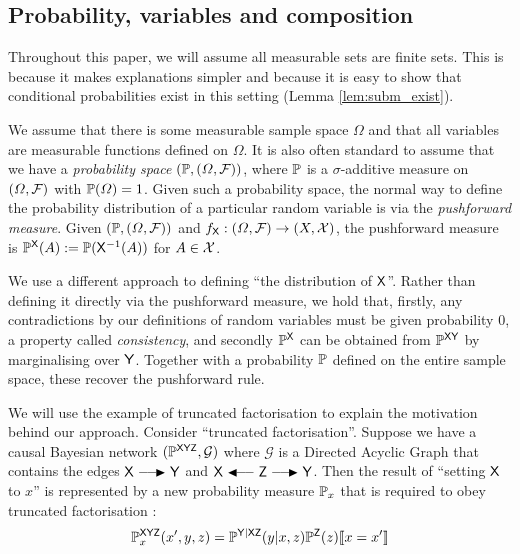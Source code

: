 
\subsection{Probability, variables and composition}

Throughout this paper, we will assume all measurable sets are finite sets. This is because it makes explanations simpler and because it is easy to show that conditional probabilities exist in this setting (Lemma \ref{lem:subm_exist}).

We assume that there is some measurable sample space $\Omega$ and that all variables are measurable functions defined on $\Omega$. It is also often standard to assume that we have a \emph{probability space} $(\mathbb{P},(\Omega,\mathcal{F}))$, where $\mathbb{P}$ is a $\sigma$-additive measure on $(\Omega,\mathcal{F})$ with $\mathbb{P}(\Omega)=1$. Given such a probability space, the normal way to define the probability distribution of a particular random variable is via the \emph{pushforward measure}. Given $(\mathbb{P},(\Omega,\mathcal{F}))$ and $f_{\mathsf{X}}:(\Omega,\mathcal{F})\to (X,\mathcal{X})$, the pushforward measure is $\mathbb{P}^{\mathsf{X}} (A) := \mathbb{P}(\mathsf{X}^{-1}(A))$ for $A\in \mathcal{X}$.

We use a different approach to defining ``the distribution of $\mathsf{X}$''. Rather than defining it directly via the pushforward measure, we hold that, firstly, any contradictions by our definitions of random variables must be given probability 0, a property called \emph{consistency}, and secondly $\mathbb{P}^{\mathsf{X}}$ can be obtained from $\mathbb{P}^{\mathsf{XY}}$ by marginalising over $\mathsf{Y}$. Together with a probability $\mathbb{P}$ defined on the entire sample space, these recover the pushforward rule.

We will use the example of truncated factorisation to explain the motivation behind our approach. Consider ``truncated factorisation''. Suppose we have a causal Bayesian network $(\mathbb{P}^{\mathsf{XYZ}},\mathcal{G})$ where $\mathcal{G}$ is a Directed Acyclic Graph that contains the edges $\RV{X}\longrightarrowRHD \RV{Y}$ and $\RV{X}\longleftarrowRHD \RV{Z} \longrightarrowRHD \RV{Y}$. Then the result of ``setting $\mathsf{X}$ to $x$'' is represented by a new probability measure $\mathbb{P}_x$ that is required to obey truncated factorisation \citep[page ~24]{pearl_causality:_2009}:
\begin{align}
	\mathbb{P}^{\mathsf{XYZ}}_{x}(x',y,z)=\mathbb{P}^{\mathsf{Y|XZ}}(y|x,z)\mathbb{P}^{\mathsf{Z}}(z)\llbracket x=x' \rrbracket\label{eq:truncated_fac}
\end{align}

